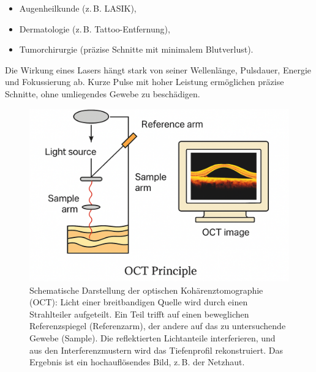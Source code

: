 \begin{itemize}
	\item Augenheilkunde (z.\,B. LASIK),
	\item Dermatologie (z.\,B. Tattoo-Entfernung),
	\item Tumorchirurgie (präzise Schnitte mit minimalem Blutverlust).
\end{itemize}

\begin{tcolorbox}[hinweisbox, title=Laserparameter]
	\label{box:laserparameter}
	\small
	Die Wirkung eines Lasers hängt stark von seiner Wellenlänge, Pulsdauer, Energie und Fokussierung ab. Kurze Pulse mit hoher Leistung ermöglichen präzise Schnitte, ohne umliegendes Gewebe zu beschädigen.
\end{tcolorbox}

\begin{figure}[H]
	\centering
	\includegraphics[width=0.85\linewidth]{bilder/oct.png}
	\caption{Schematische Darstellung der optischen Kohärenztomographie (OCT): Licht einer breitbandigen Quelle wird durch einen Strahlteiler aufgeteilt. Ein Teil trifft auf einen beweglichen Referenzspiegel (Referenzarm), der andere auf das zu untersuchende Gewebe (Sample). Die reflektierten Lichtanteile interferieren, und aus den Interferenzmustern wird das Tiefenprofil rekonstruiert. Das Ergebnis ist ein hochauflösendes Bild, z.\,B. der Netzhaut.}
	\label{fig:oct_prinzip}
\end{figure}

